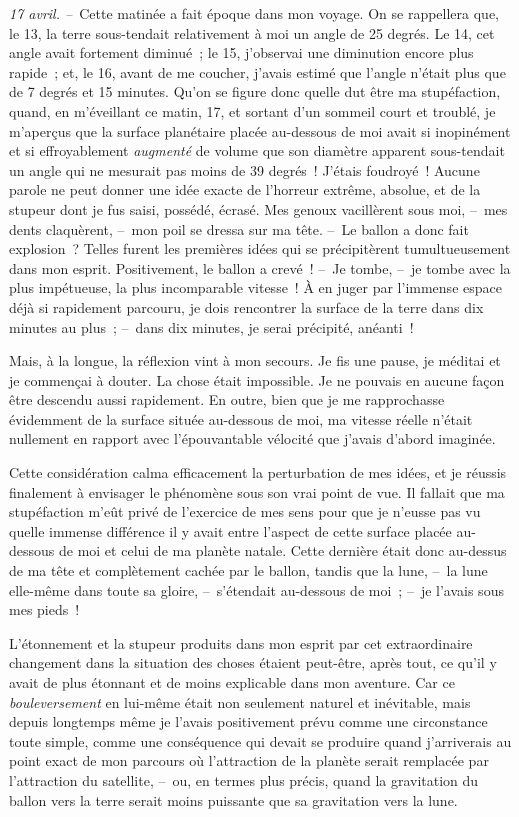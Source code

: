 \documentclass[french,twoside]{book} %
\begin{document}
\emph{17 avril. –} Cette matinée a fait époque dans mon voyage. On se rappellera que, le 13, la terre sous-tendait relativement à moi un angle de 25 degrés. Le 14, cet angle avait fortement diminué ; le 15, j’observai une diminution encore plus rapide ; et, le 16, avant de me coucher, j’avais estimé que l’angle n’était plus que de 7 degrés et 15 minutes. Qu’on se figure donc quelle dut être ma stupéfaction, quand, en m’éveillant ce matin, 17, et sortant d’un sommeil court et troublé, je m’aperçus que la surface planétaire placée au-dessous de moi avait si inopinément et si effroyablement \emph{augmenté} de volume que son diamètre apparent sous-tendait un angle qui ne mesurait pas moins de 39 degrés ! J’étais foudroyé ! Aucune parole ne peut donner une idée exacte de l’horreur extrême, absolue, et de la stupeur dont je fus saisi, possédé, écrasé. Mes genoux vacillèrent sous moi, – mes dents claquèrent, – mon poil se dressa sur ma tête. – Le ballon a donc fait explosion ? Telles furent les premières idées qui se précipitèrent tumultueusement dans mon esprit. Positivement, le ballon a crevé ! – Je tombe, – je tombe avec la plus impétueuse, la plus incomparable vitesse ! À en juger par l’immense espace déjà si rapidement parcouru, je dois rencontrer la surface de la terre dans dix minutes au plus ; – dans dix minutes, je serai précipité, anéanti !\par
Mais, à la longue, la réflexion vint à mon secours. Je fis une pause, je méditai et je commençai à douter. La chose était impossible. Je ne pouvais en aucune façon être descendu aussi rapidement. En outre, bien que je me rapprochasse évidemment de la surface située au-dessous de moi, ma vitesse réelle n’était nullement en rapport avec l’épouvantable vélocité que j’avais d’abord imaginée.\par
Cette considération calma efficacement la perturbation de mes idées, et je réussis finalement à envisager le phénomène sous son vrai point de vue. Il fallait que ma stupéfaction m’eût privé de l’exercice de mes sens pour que je n’eusse pas vu quelle immense différence il y avait entre l’aspect de cette surface placée au-dessous de moi et celui de ma planète natale. Cette dernière était donc au-dessus de ma tête et complètement cachée par le ballon, tandis que la lune, – la lune elle-même dans toute sa gloire, – s’étendait au-dessous de moi ; – je l’avais sous mes pieds !\par
L’étonnement et la stupeur produits dans mon esprit par cet extraordinaire changement dans la situation des choses étaient peut-être, après tout, ce qu’il y avait de plus étonnant et de moins explicable dans mon aventure. Car ce \emph{bouleversement} en lui-même était non seulement naturel et inévitable, mais depuis longtemps même je l’avais positivement prévu comme une circonstance toute simple, comme une conséquence qui devait se produire quand j’arriverais au point exact de mon parcours où l’attraction de la planète serait remplacée par l’attraction du satellite, – ou, en termes plus précis, quand la gravitation du ballon vers la terre serait moins puissante que sa gravitation vers la lune.\par
\end{document}
